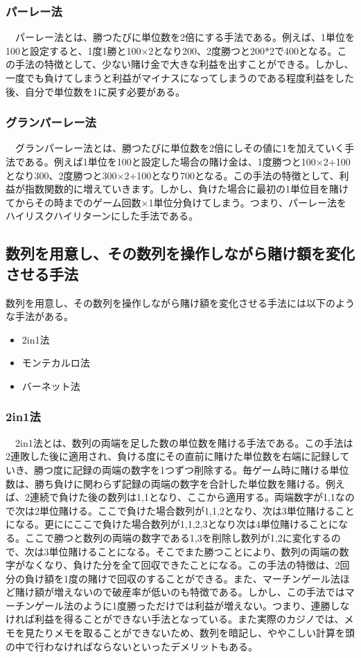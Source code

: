 \subsubsection{パーレー法}  
　パーレー法とは、勝つたびに単位数を2倍にする手法である。例えば、1単位を100と設定すると、1度1勝と100×2となり200、2度勝つと200*2で400となる。この手法の特徴として、少ない賭け金で大きな利益を出すことができる。しかし、一度でも負けてしまうと利益がマイナスになってしまうのである程度利益をした後、自分で単位数を1に戻す必要がある。
\subsubsection{グランパーレー法}  
　グランパーレー法とは、勝つたびに単位数を2倍にしその値に1を加えていく手法である。例えば1単位を100と設定した場合の賭け金は、1度勝つと100×2+100となり300、2度勝つと300×2+100となり700となる。この手法の特徴として、利益が指数関数的に増えていきます。しかし、負けた場合に最初の1単位目を賭けてからその時までのゲーム回数×1単位分負けてしまう。つまり、パーレー法をハイリスクハイリターンにした手法である。

\subsection{数列を用意し、その数列を操作しながら賭け額を変化させる手法}
 数列を用意し、その数列を操作しながら賭け額を変化させる手法には以下のような手法がある。
  \begin{itemize}
 \item 2in1法
 \item モンテカルロ法
 \item バーネット法
 \end{itemize}
\subsubsection{2in1法}  
　2in1法とは、数列の両端を足した数の単位数を賭ける手法である。この手法は2連敗した後に適用され、負ける度にその直前に賭けた単位数を右端に記録していき、勝つ度に記録の両端の数字を1つずつ削除する。毎ゲーム時に賭ける単位数は、勝ち負けに関わらず記録の両端の数字を合計した単位数を賭ける。例えば、2連続で負けた後の数列は{1,1}となり、ここから適用する。両端数字が1,1なので次は2単位賭ける。ここで負けた場合数列が{1,1,2}となり、次は3単位賭けることになる。更ににここで負けた場合数列が{1,1,2,3}となり次は4単位賭けることになる。ここで勝つと数列の両端の数字である1,3を削除し数列が{1,2}に変化するので、次は3単位賭けることになる。そこでまた勝つことにより、数列の両端の数字がなくなり、負けた分を全て回収できたことになる。この手法の特徴は、2回分の負け額を1度の賭けで回収のすることができる。また、マーチンゲール法ほど賭け額が増えないので破産率が低いのも特徴である。しかし、この手法ではマーチンゲール法のように1度勝っただけでは利益が増えない。つまり、連勝しなければ利益を得ることができない手法となっている。また実際のカジノでは、メモを見たりメモを取ることができないため、数列を暗記し、ややこしい計算を頭の中で行わなければならないといったデメリットもある。
